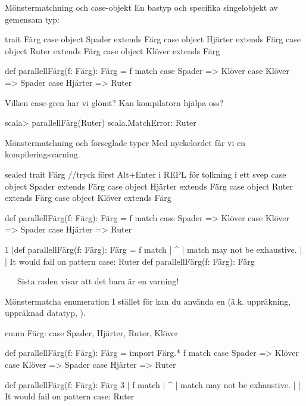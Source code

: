 \begin{Slide}{Mönstermatchning och case-objekt}\SlideFontSmall
En bastyp och specifika singelobjekt av gemensam typ:
\begin{Code}
trait Färg
case object Spader  extends Färg
case object Hjärter extends Färg
case object Ruter   extends Färg
case object Klöver  extends Färg

def parallellFärg(f: Färg): Färg = f match
  case Spader  => Klöver
  case Klöver  => Spader
  case Hjärter => Ruter
\end{Code}
Vilken case-gren har vi glömt? Kan kompilatorn hjälpa oss?
\pause
\begin{REPL}
scala> parallellFärg(Ruter)
scala.MatchError: Ruter 
\end{REPL}
 \code{:(}
\end{Slide}

\begin{Slide}{Mönstermatchning och förseglade typer}\SlideFontSmall
Med nyckelordet  får vi en kompileringsvarning.
\begin{Code}
sealed trait Färg  //tryck först Alt+Enter i REPL för tolkning i ett svep
case object Spader  extends Färg
case object Hjärter extends Färg
case object Ruter   extends Färg
case object Klöver  extends Färg

def parallellFärg(f: Färg): Färg = f match 
  case Spader  => Klöver
  case Klöver  => Spader
  case Hjärter => Ruter
\end{Code}
\begin{REPL}
1 |def parallellFärg(f: Färg): Färg = f match 
  |                                   ^
  |                           match may not be exhaustive.
  |
  |                           It would fail on pattern case: Ruter
def parallellFärg(f: Färg): Färg
\end{REPL}
 \code{:)} ~~~Sista raden visar att det bara är en varning!
\end{Slide}

\begin{Slide}{Mönstermatcha enumeration}\SlideFontSmall
I stället för  kan du använda en  (ä.k. uppräkning, uppräknad datatyp, ).
\begin{Code}
enum Färg:
  case Spader, Hjärter, Ruter, Klöver
  
def parallellFärg(f: Färg): Färg = 
  import Färg.*
  f match 
    case Spader  => Klöver
    case Klöver  => Spader
    case Hjärter => Ruter
\end{Code}
\pause
\begin{REPL}
def parallellFärg(f: Färg): Färg
3 |  f match 
  |  ^
  |  match may not be exhaustive.
  |
  |  It would fail on pattern case: Ruter
\end{REPL}
 \code{:)} 
\end{Slide}

